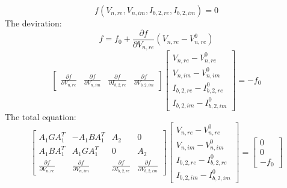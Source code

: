 \documentclass{book}
\begin{document}
\begin{equation}
f(V_{n,re},V_{n,im},I_{b,2,re},I_{b,2,im})=0
\end{equation}
The deviration:
\begin{equation}
f=f_{0}+\frac{\partial f}{\partial V_{n,re}}(V_{n,re}-V_{n,re}^{0})
\end{equation}
\begin{equation}
\begin{bmatrix}
\frac{\partial f}{\partial V_{n,re}}&\frac{\partial f}{\partial
V_{n,im}}&\frac{\partial f}{\partial I_{b,2,re}}&\frac{\partial f}{\partial
V_{b,2,im}}
\end{bmatrix}
\begin{bmatrix}
V_{n,re}-V_{n,re}^{0}\\
V_{n,im}-V_{n,im}^{0}\\
I_{b,2,re}-I_{b,2,re}^{0}\\
I_{b,2,im}-I_{b,2,im}^{0}
\end{bmatrix}
=-f_0
\end{equation}
The total equation:
\begin{equation}
\begin{bmatrix}
A_1GA_1^{T}&-A_1BA_1^{T}&A_2&0\\
A_1BA_1^{T}&A_1GA_1^{T}&0&A_2\\
\frac{\partial f}{\partial V_{n,re}}&\frac{\partial f}{\partial
V_{n,im}}&\frac{\partial f}{\partial I_{b,2,re}}&\frac{\partial f}{\partial
V_{b,2,im}}
\end{bmatrix}
\begin{bmatrix}
V_{n,re}-V_{n,re}^{0}\\
V_{n,im}-V_{n,im}^{0}\\
I_{b,2,re}-I_{b,2,re}^{0}\\
I_{b,2,im}-I_{b,2,im}^{0}
\end{bmatrix}
=
\begin{bmatrix}
0\\0\\-f_0
\end{bmatrix}
\end{equation}
\end{document}
